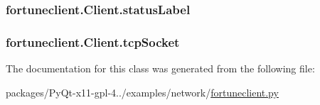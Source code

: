 \subsubsection[{status\+Label}]{\setlength{\rightskip}{0pt plus 5cm}fortuneclient.\+Client.\+status\+Label}\label{classfortuneclient_1_1Client_a78d292082974d3d2214dc6a4fa822973}
\hypertarget{classfortuneclient_1_1Client_ad57d86327e233073652e8ad8644e33a6}{}
\subsubsection[{tcp\+Socket}]{\setlength{\rightskip}{0pt plus 5cm}fortuneclient.\+Client.\+tcp\+Socket}\label{classfortuneclient_1_1Client_ad57d86327e233073652e8ad8644e33a6}


The documentation for this class was generated from the following file\+:\begin{DoxyCompactItemize}
\item 
packages/\+Py\+Qt-\/x11-\/gpl-\/4../examples/network/\hyperlink{fortuneclient_8py}{fortuneclient.\+py}\end{DoxyCompactItemize}
